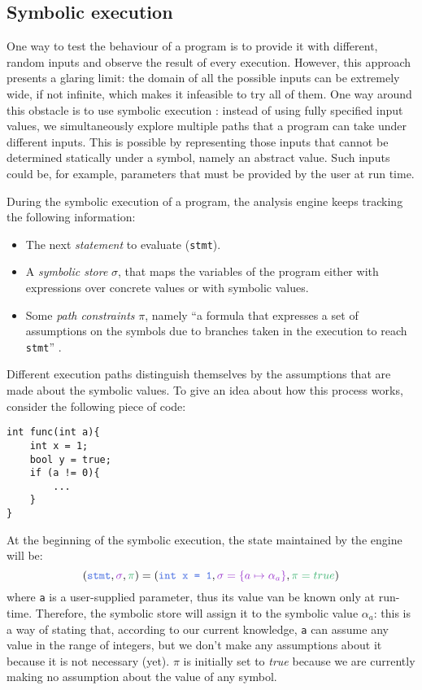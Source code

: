 \documentclass[target=mst,aauheader=aics]{thud}
\theoremstyle{definition}
\begin{document}
	\subsection{Symbolic execution}\label{sec:symbolic-exec}
	One way to test the behaviour of a program is to provide it with different, random inputs and observe the result of every execution. However, this approach presents a glaring limit: the domain of all the possible inputs can be extremely wide, if not infinite, which makes it infeasible to try all of them. One way around this obstacle is to use symbolic execution \cite{Baldoni2018} \cite{King76}: instead of using fully specified input values, we simultaneously explore multiple paths that a program can take under different inputs. This is possible by representing those inputs that cannot be determined statically under a symbol, namely an abstract value. Such inputs could be, for example, parameters that must be provided by the user at run time.
	
	During the symbolic execution of a program, the analysis engine keeps tracking the following information:
	\begin{itemize}
		\item The next \textit{statement} to evaluate (\texttt{stmt}).
		\item A \textit{symbolic store} $\sigma$, that maps the variables of the program either with expressions over concrete values or with symbolic values.
		\item Some \textit{path constraints} $\pi$, namely ``a formula that expresses a set of assumptions on the symbols due to branches taken in the execution to reach \texttt{stmt}'' \cite{Baldoni2018}.
	\end{itemize}
	Different execution paths distinguish themselves by the assumptions that are made about the symbolic values. To give an idea about how this process works, consider the following piece of code:
	
	\vspace{3mm}
	\begin{minipage}{.4\textwidth}
	\begin{lstlisting}
int func(int a){
	int x = 1;
	bool y = true;
	if (a != 0){
		...
	}
}
	\end{lstlisting} 
	\end{minipage}

	At the beginning of the symbolic execution, the state maintained by the engine will be:
	\[
	(\textcolor{blue}{\texttt{stmt}}, \textcolor{violet}{\sigma}, \textcolor{green}{\pi}) = (\textcolor{blue}{\texttt{int x = 1}}, \textcolor{violet}{\sigma = \{a \mapsto \alpha_a\}}, \textcolor{green}{\pi = true})
	\]
	where \texttt{a} is a user-supplied parameter, thus its value van be known only at run-time. Therefore, the symbolic store will assign it to the symbolic value $\alpha_a$: this is a way of stating that, according to our current knowledge, \texttt{a} can assume any value in the range of integers, but we don't make any assumptions about it because it is not necessary (yet). $\pi$ is initially set to \textit{true} because we are currently making no assumption about the value of any symbol.
	
\end{document}
